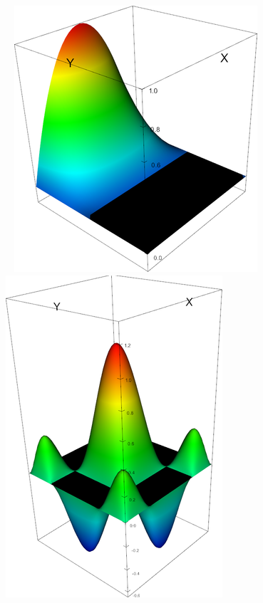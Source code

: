 \begin{frame}[fragile]
\begin{figure}
		~
		\includegraphics*[scale=0.23]{graphic/fe/q2_fe}
		~
		\includegraphics*[height=.25\textwidth]{graphic/fe/q4_fe}
	\end{figure}
\end{frame}

